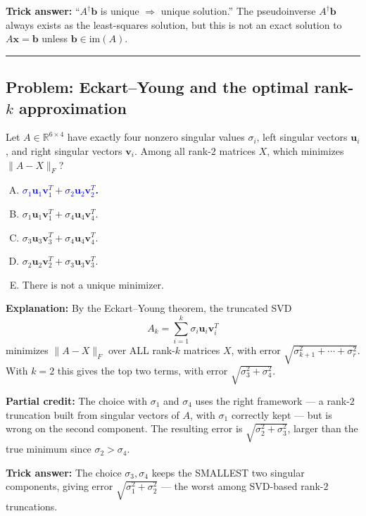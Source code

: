\documentclass[12pt]{amsart}
\newcommand{\divider}{
  \vspace{-1em}
  \noindent
  \raisebox{-0.15ex}{\textbullet}%
  \hspace{0.5em}%
  \rule[0.5ex]{0.95\textwidth}{1.0pt}%
  \hspace{0.5em}%
  \raisebox{-0.15ex}{\textbullet}%
  \vspace{0em}
}
\begin{document}
\textbf{Trick answer:}
``$A^\dagger\mathbf{b}$ is unique $\Rightarrow$ unique solution.''
The pseudoinverse $A^\dagger\mathbf{b}$ always exists as the least-squares
solution, but this is not an exact solution to $A\mathbf{x} = \mathbf{b}$
unless $\mathbf{b} \in \mathrm{im}(A)$.

\divider

\subsection*{Problem: Eckart--Young and the optimal rank-$k$ approximation}

Let $A \in \mathbb{R}^{6 \times 4}$ have exactly four nonzero singular values
$\sigma_i$, left singular vectors $\mathbf{u}_i$, and right singular vectors
$\mathbf{v}_i$. Among all rank-$2$ matrices $X$, which minimizes
$\|A - X\|_F$?

\begin{enumerate}[(A)]
\item \textcolor{blue}{\textbf{$\sigma_1\mathbf{u}_1\mathbf{v}_1^T + \sigma_2\mathbf{u}_2\mathbf{v}_2^T$.}}
\item $\sigma_1\mathbf{u}_1\mathbf{v}_1^T + \sigma_4\mathbf{u}_4\mathbf{v}_4^T$.
\item $\sigma_3\mathbf{u}_3\mathbf{v}_3^T + \sigma_4\mathbf{u}_4\mathbf{v}_4^T$.
\item $\sigma_2\mathbf{u}_2\mathbf{v}_2^T + \sigma_3\mathbf{u}_3\mathbf{v}_3^T$.
\item There is not a unique minimizer.
\end{enumerate}

\textbf{Explanation:}
By the Eckart--Young theorem, the truncated SVD
$$A_k = \sum_{i=1}^k \sigma_i\mathbf{u}_i\mathbf{v}_i^T$$
minimizes $\|A - X\|_F$ over ALL rank-$k$ matrices $X$, with error
$\sqrt{\sigma_{k+1}^2 + \cdots + \sigma_r^2}$. With $k = 2$ this gives the
top two terms, with error $\sqrt{\sigma_3^2 + \sigma_4^2}$.

\textbf{Partial credit:}
The choice with $\sigma_1$ and $\sigma_4$ uses the right framework --- a
rank-$2$ truncation built from singular vectors of $A$, with $\sigma_1$
correctly kept --- but is wrong on the second component. The resulting error
is $\sqrt{\sigma_2^2 + \sigma_3^2}$, larger than the true minimum since
$\sigma_2 > \sigma_4$.

\textbf{Trick answer:}
The choice $\sigma_3, \sigma_4$ keeps the SMALLEST two singular components,
giving error $\sqrt{\sigma_1^2 + \sigma_2^2}$ --- the worst among SVD-based
rank-$2$ truncations.
\end{document}
